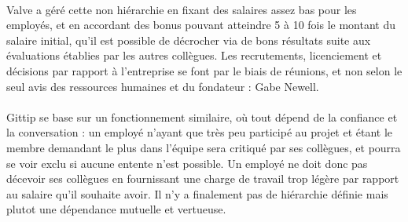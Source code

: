 \paragraph{}
Valve a géré cette non hiérarchie en fixant des salaires assez bas pour les
employés, et en accordant des bonus pouvant atteindre 5 à 10 fois le montant du
salaire initial, qu'il est possible de décrocher via de bons résultats suite
aux évaluations établies par les autres collègues. Les recrutements,
licenciement et décisions par rapport à l'entreprise se font par le biais de
réunions, et non selon le seul avis des ressources humaines et du fondateur :
Gabe Newell.

\paragraph{}
Gittip se base sur un fonctionnement similaire, où tout dépend de la
confiance et la conversation : un employé n'ayant que très peu participé au
projet et étant le membre demandant le plus dans l'équipe sera critiqué par ses
collègues, et pourra se voir exclu si aucune entente n'est possible. Un employé
ne doit donc pas décevoir ses collègues en fournissant une charge de travail
trop légère par rapport au salaire qu'il souhaite avoir. Il n'y a
finalement pas de hiérarchie définie mais plutot une dépendance mutuelle
et vertueuse.
